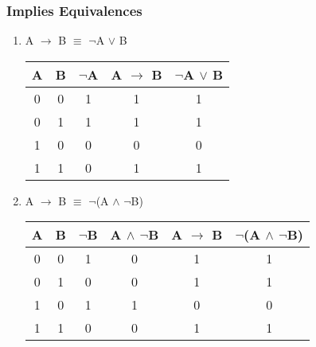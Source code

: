 \documentclass[12pt]{article}
\begin{document}
\subsubsection{Implies Equivalences}

\begin{enumerate}



  \item A $\to$ B $\equiv$ $\neg$A $\lor$ B



\begin{center}

  \begin{tabular}{| c | c | c | c | c |}

    \hline

    A & B & $\neg$A & A $\to$ B & $\neg$A $\lor$ B \\ \hline

    0 & 0 & 1 & 1 & 1 \\

    0 & 1 & 1 & 1 & 1 \\ 

    1 & 0 & 0 & 0 & 0 \\

    1 & 1 & 0 & 1 & 1 \\ \hline

  \end{tabular}

\end{center}



  \item A $\to$ B $\equiv$ $\neg$(A $\land$ $\neg$B)



\begin{center}

  \begin{tabular}{| c | c | c | c | c | c |}

    \hline

    A & B & $\neg$B & A $\land$ $\neg$B & A $\to$ B & $\neg$(A $\land$ $\neg$B) \\ \hline

    0 & 0 & 1 & 0 & 1 & 1 \\

    0 & 1 & 0 & 0 & 1 & 1 \\

    1 & 0 & 1 & 1 & 0 & 0 \\

    1 & 1 & 0 & 0 & 1 & 1 \\ \hline


\end{tabular}
\end{center}
\end{enumerate}
\end{document}
